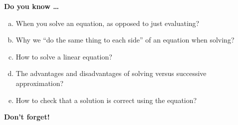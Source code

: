 \newpage



\bigskip

\noindent \textbf{Do you know \ldots} %

\begin{enumerate} [(a)]
\item When you solve an equation, as opposed to just evaluating?  
\item Why we ``do the same thing to each side'' of an equation when solving? 
\item How to solve a linear equation? 
\item The advantages and disadvantages of solving versus successive approximation? 
\item How to check that a solution is correct using the equation? 
\end{enumerate}

\bigskip

\noindent \textbf{Don't forget!}
